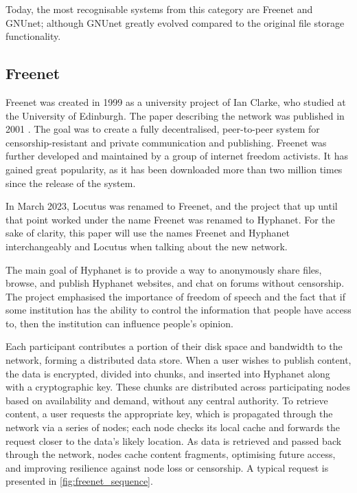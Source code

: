 Today, the most recognisable systems from this category are Freenet and GNUnet; although GNUnet greatly evolved compared to the original file storage functionality.

\subsection{Freenet}
Freenet was created in 1999 as a university project of Ian Clarke, who studied at the University of Edinburgh. The paper describing the network was published in 2001 \cite{freenet}. The goal was to create a fully decentralised, peer-to-peer system for censorship-resistant and private communication and publishing. Freenet was further developed and maintained by a group of internet freedom activists. It has gained great popularity, as it has been downloaded more than two million times since the release of the system.

In March 2023, Locutus was renamed to Freenet, and the project that up until that point worked under the name Freenet was renamed to Hyphanet.
For the sake of clarity, this paper will use the names Freenet and Hyphanet interchangeably and Locutus when talking about the new network.

The main goal of Hyphanet is to provide a way to anonymously share files, browse, and publish Hyphanet websites, and chat on forums without censorship. The project emphasised the importance of freedom of speech and the fact that if some institution has the ability to control the information that people have access to, then the institution can influence people's opinion.

Each participant contributes a portion of their disk space and bandwidth to the network, forming a distributed data store. When a user wishes to publish content, the data is encrypted, divided into chunks, and inserted into Hyphanet along with a cryptographic key. These chunks are distributed across participating nodes based on availability and demand, without any central authority. To retrieve content, a user requests the appropriate key, which is propagated through the network via a series of nodes; each node checks its local cache and forwards the request closer to the data's likely location. As data is retrieved and passed back through the network, nodes cache content fragments, optimising future access, and improving resilience against node loss or censorship. A typical request is presented in \ref{fig:freenet_sequence}.

